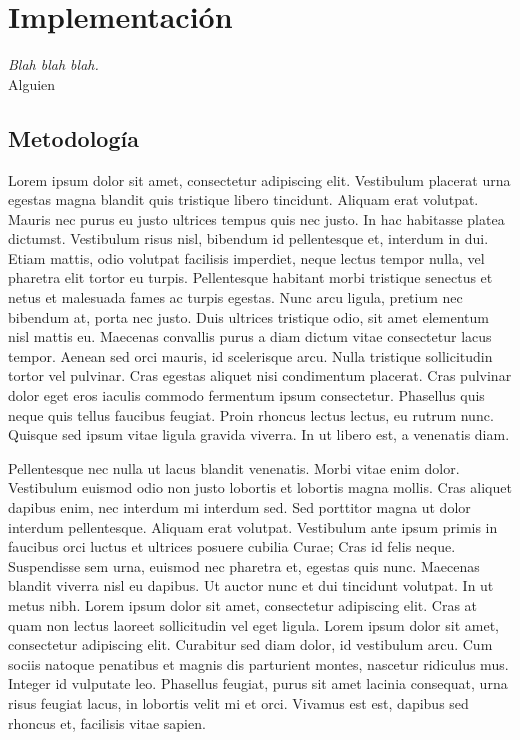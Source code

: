 
\chapter*{Implementación} \label{cap5}


\begin{flushright}
\begin{minipage}{7.85cm}
    {\em Blah blah blah.} \\  Alguien
\end{minipage}
\end{flushright}

\vspace*{5mm}

\section*{Metodología}

Lorem ipsum dolor sit amet, consectetur adipiscing elit. Vestibulum placerat
urna egestas magna blandit quis tristique libero tincidunt. Aliquam erat
volutpat. Mauris nec purus eu justo ultrices tempus quis nec justo. In hac
habitasse platea dictumst. Vestibulum risus nisl, bibendum id pellentesque et,
interdum in dui. Etiam mattis, odio volutpat facilisis imperdiet, neque lectus
tempor nulla, vel pharetra elit tortor eu turpis. Pellentesque habitant morbi
tristique senectus et netus et malesuada fames ac turpis egestas. Nunc arcu
ligula, pretium nec bibendum at, porta nec justo. Duis ultrices tristique odio,
sit amet elementum nisl mattis eu. Maecenas convallis purus a diam dictum vitae
consectetur lacus tempor. Aenean sed orci mauris, id scelerisque arcu. Nulla
tristique sollicitudin tortor vel pulvinar. Cras egestas aliquet nisi
condimentum placerat. Cras pulvinar dolor eget eros iaculis commodo fermentum
ipsum consectetur. Phasellus quis neque quis tellus faucibus feugiat. Proin
rhoncus lectus lectus, eu rutrum nunc. Quisque sed ipsum vitae ligula gravida
viverra. In ut libero est, a venenatis diam.

Pellentesque nec nulla ut lacus blandit venenatis. Morbi vitae enim dolor.
Vestibulum euismod odio non justo lobortis et lobortis magna mollis. Cras
aliquet dapibus enim, nec interdum mi interdum sed. Sed porttitor magna ut dolor
interdum pellentesque. Aliquam erat volutpat. Vestibulum ante ipsum primis in
faucibus orci luctus et ultrices posuere cubilia Curae; Cras id felis neque.
Suspendisse sem urna, euismod nec pharetra et, egestas quis nunc. Maecenas
blandit viverra nisl eu dapibus. Ut auctor nunc et dui tincidunt volutpat. In ut
metus nibh. Lorem ipsum dolor sit amet, consectetur adipiscing elit. Cras at
quam non lectus laoreet sollicitudin vel eget ligula. Lorem ipsum dolor sit
amet, consectetur adipiscing elit. Curabitur sed diam dolor, id vestibulum arcu.
Cum sociis natoque penatibus et magnis dis parturient montes, nascetur ridiculus
mus. Integer id vulputate leo. Phasellus feugiat, purus sit amet lacinia
consequat, urna risus feugiat lacus, in lobortis velit mi et orci. Vivamus est
est, dapibus sed rhoncus et, facilisis vitae sapien.

